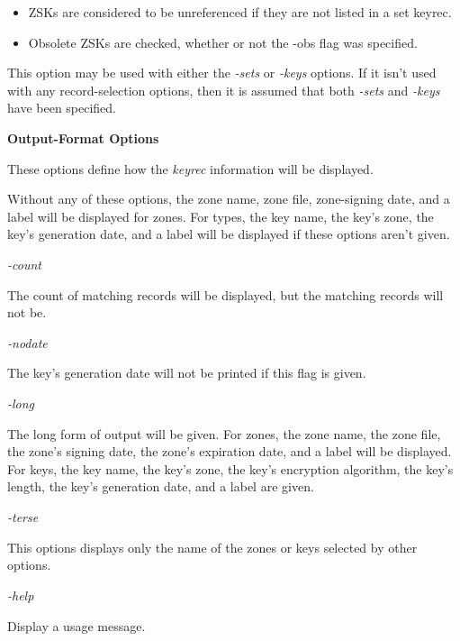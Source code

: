 \begin{description}
\begin{itemize}
\item ZSKs are considered to be unreferenced if they are not listed in a set
keyrec.

\item Obsolete ZSKs are checked, whether or not the -obs flag was specified.

\end{itemize}

This option may be used with either the {\it -sets} or {\it -keys} options.
If it isn't used with any record-selection options, then it is assumed that
both {\it -sets} and {\it -keys} have been specified.

\end{description}

{\bf Output-Format Options}

These options define how the {\it keyrec} information will be displayed.

Without any of these options, the zone name, zone file, zone-signing date,
and a label will be displayed for zones.  For types, the key name, the key's
zone, the key's generation date, and a label will be displayed if these
options aren't given.

\begin{description}

\item {\it -count}\verb" "

The count of matching records will be displayed, but the matching records
will not be.

\item {\it -nodate}\verb" "

The key's generation date will not be printed if this flag is given.

\item {\it -long}\verb" "

The long form of output will be given.  For zones, the zone name, the zone
file, the zone's signing date, the zone's expiration date, and a label will
be displayed.  For keys, the key name, the key's zone, the key's encryption
algorithm, the key's length, the key's generation date, and a label are
given.

\item {\it -terse}\verb" "

This options displays only the name of the zones or keys selected by other
options.

\item {\it -help}\verb" "

Display a usage message.

\end{description}

